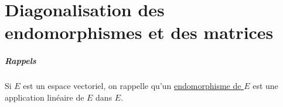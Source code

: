 \chapter{Diagonalisation des endomorphismes et des matrices}

\paragraph{Rappels} Si $E$ est un espace vectoriel, on rappelle qu'un \underline{endomorphisme de $E$} est une application linéaire de $E$ dans $E$.
